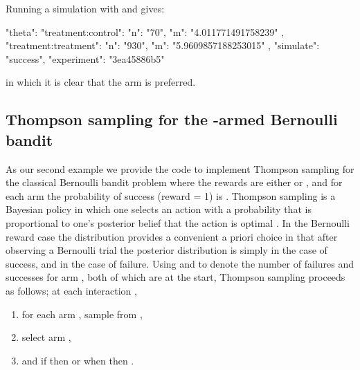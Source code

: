 \documentclass[nojss]{jss}
\begin{document}
Running a simulation with  and  gives:
\begin{Code}
{
    "theta": {
        "treatment:control": {
            "n": "70",
            "m": "4.011771491758239"
        },
        "treatment:treatment": {
            "n": "930",
            "m": "5.9609857188253015"
        }
    },
    "simulate": "success",
    "experiment": "3ea45886b5"
}
\end{Code}
in which it is clear that the  arm is preferred.

\subsection{Thompson sampling for the -armed Bernoulli bandit}
\label{sec:thompson}

As our second example we provide the code to implement Thompson sampling for the classical Bernoulli bandit problem where the rewards are either  or , and for each arm  the probability of success (reward = 1) is  \citep{Kaufmann2012}. Thompson sampling is a Bayesian policy in which one selects an action with a probability that is  proportional to one's posterior belief that the action is optimal \citep[see][for details]{Kaufmann2012}. In the Bernoulli reward case the  distribution provides a convenient a priori choice in that after observing a Bernoulli trial the posterior distribution is simply  in the case of success, and  in the case of failure. Using  and  to denote the number of failures and successes for arm , both of which are  at the start, Thompson sampling proceeds as follows; at each interaction ,
\begin{enumerate}
\item for each arm , sample  from ,
\item select arm ,
\item and if  then  or when  then .
\end{enumerate}
\end{document}
